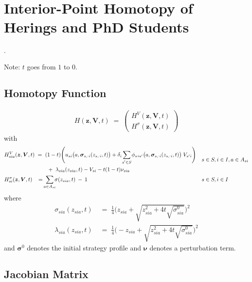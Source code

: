 \documentclass[11pt,fleqn]{article}
\newcommand{\bsigma}{\bm{\sigma}}
\newcommand{\bV}{\bm{V}}
\newcommand{\bnu}{\bm{\nu}}
\newcommand{\bz}{\bm{z}}
\newcommand{\shortminus}{{\text{\scalebox{0.4}[1.0]{\(-\)}}}}
\newcommand{\minusi}{\shortminus i}
\newcommand{\shortrightarrow}{\parbox{4pt}{\tikz{\draw[->](0,0)--(4pt,0);}}}
\newcommand{\phiss}{\phi_{s\shortrightarrow s'}}
\begin{document}
\newpage
\section{Interior-Point Homotopy of Herings and PhD Students}

\citep*{Heringsetal2021}.

Note: $t$ goes from $1$ to $0$.

\subsection*{Homotopy Function}

\begin{align*}
	H(\bz,\bV,t) \;=\;
	\begin{pmatrix} 
		H^{V}(\bz,\bV,t) \\ 
		H^{\sigma}(\bz,\bV,t) 
	\end{pmatrix}
\end{align*}
with
\begin{align*}
	& \begin{aligned}
		H^V_{sia}(\bz,\bV,t) & \;=\; (1-t) \Biggl( u_{si}\bigl(a,\bsigma_{s,\minusi}(z_{s,\minusi},t)\bigr) + \delta_i \sum\limits_{\mathclap{s'\in S}} \phiss\bigl(a,\bsigma_{s,\minusi}(z_{s,\minusi},t)\bigr) \; V_{s'i} \Biggr) \\
		& \qquad \;+\; \lambda_{sia}(z_{sia}, t) - V_{si} - t(1-t) \nu_{sia}
	\end{aligned} && s\in S, i\in I, a\in A_{si} \\
	& H^\sigma_{si}(\bz,\bV,t) \;\; \;=\; \sum\limits_{\mathclap{a\in A_{si}}} \sigma(z_{sia},t) \:-\: 1 && s\in S, i\in I
\end{align*}
where
\begin{align*}
	\sigma_{sia}(z_{sia}, t) & \;=\; \frac{1}{4} \Biggl( z_{sia} + \sqrt{z_{sia}^2+4t\sqrt{\sigma^0_{sia}}} \Biggr)^2 \\
	\lambda_{sia}(z_{sia}, t) & \;=\; \frac{1}{4} \Biggl( - z_{sia} + \sqrt{z_{sia}^2+4t\sqrt{\sigma^0_{sia}}} \Biggr)^2
\end{align*}
and $\bsigma^0$ denotes the initial strategy profile and $\bnu$ denotes a perturbation term.


\subsection*{Jacobian Matrix}
\end{document}
